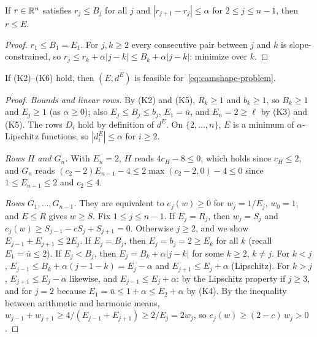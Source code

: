 \begin{lemma}\label{lem:camshape-minplus}
If $r \in \mathbb{R}^n$ satisfies $r_j \le B_j$ for all $j$ and $|r_{j+1} - r_j| \le \alpha$ for $2 \le j \le n-1$, then $r \le E$.
\end{lemma}

\begin{proof}
$r_1 \le B_1 = E_1$.
For $j, k \ge 2$ every consecutive pair between $j$ and $k$ is slope-constrained, so $r_j \le r_k + \alpha|j-k| \le B_k + \alpha|j-k|$; minimize over $k$.
\end{proof}

\begin{lemma}\label{lem:camshape-feasible}
If (K2)--(K6) hold, then $(E, d^E)$ is feasible for~\eqref{eq:camshape-problem}.
\end{lemma}

\begin{proof}
\emph{Bounds and linear rows.}
By (K2) and (K5), $R_k \ge 1$ and $b_k \ge 1$, so $B_k \ge 1$ and $E_j \ge 1$ (as $\alpha \ge 0$); also $E_j \le B_j \le b_j$, $E_1 = \bar u$, and $E_n = 2 \ge \ell$ by (K3) and (K5).
The rows $D_i$ hold by definition of $d^E$.
On $\{2,\dots,n\}$, $E$ is a minimum of $\alpha$-Lipschitz functions, so $|d^E_i| \le \alpha$ for $i \ge 2$.

\emph{Rows $H$ and $G_n$.}
With $E_n = 2$, $H$ reads $4c_H - 8 \le 0$, which holds since $c_H \le 2$, and $G_n$ reads $(c_2 - 2)E_{n-1} - 4 \le 2\max(c_2 - 2, 0) - 4 \le 0$ since $1 \le E_{n-1} \le 2$ and $c_2 \le 4$.

\emph{Rows $G_1,\dots,G_{n-1}$.}
They are equivalent to $e_j(w) \ge 0$ for $w_j = 1/E_j$, $w_0 = 1$, and $E \le R$ gives $w \ge S$.
Fix $1 \le j \le n-1$.
If $E_j = R_j$, then $w_j = S_j$ and $e_j(w) \ge S_{j-1} - cS_j + S_{j+1} = 0$.
Otherwise $j \ge 2$, and we show $E_{j-1} + E_{j+1} \le 2E_j$.
If $E_j = B_j$, then $E_j = b_j = 2 \ge E_k$ for all $k$ (recall $E_1 = \bar u \le 2$).
If $E_j < B_j$, then $E_j = B_k + \alpha|j-k|$ for some $k \ge 2$, $k \ne j$.
For $k < j$, $E_{j-1} \le B_k + \alpha(j-1-k) = E_j - \alpha$ and $E_{j+1} \le E_j + \alpha$ (Lipschitz).
For $k > j$, $E_{j+1} \le E_j - \alpha$ likewise, and $E_{j-1} \le E_j + \alpha$: by the Lipschitz property if $j \ge 3$, and for $j = 2$ because $E_1 = \bar u \le 1 + \alpha \le E_2 + \alpha$ by (K4).
By the inequality between arithmetic and harmonic means, $w_{j-1} + w_{j+1} \ge 4/(E_{j-1} + E_{j+1}) \ge 2/E_j = 2w_j$, so $e_j(w) \ge (2 - c)\,w_j > 0$.
\end{proof}

